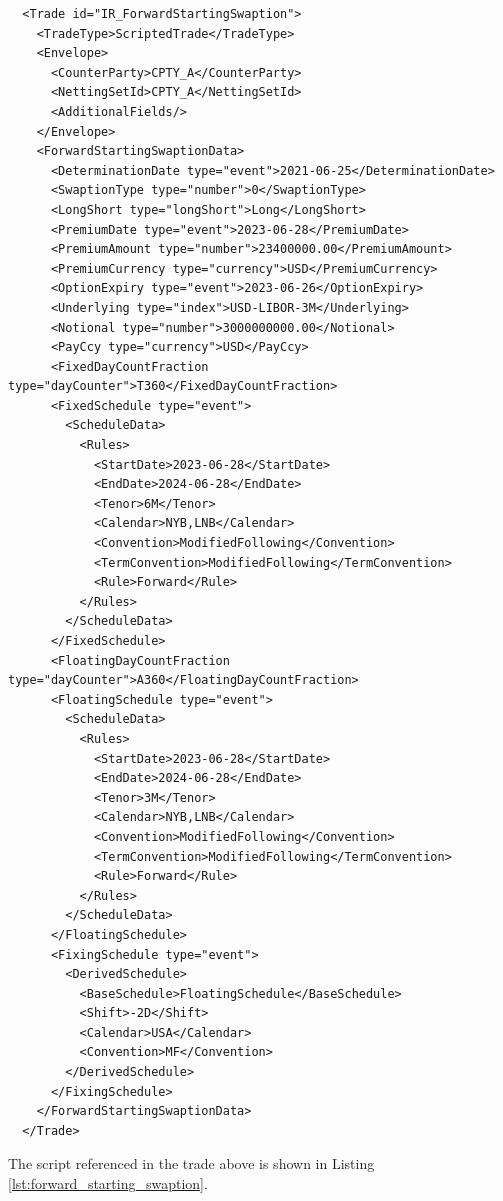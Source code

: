 \begin{verbatim}
  <Trade id="IR_ForwardStartingSwaption">
    <TradeType>ScriptedTrade</TradeType>
    <Envelope>
      <CounterParty>CPTY_A</CounterParty>
      <NettingSetId>CPTY_A</NettingSetId>
      <AdditionalFields/>
    </Envelope>
    <ForwardStartingSwaptionData>
      <DeterminationDate type="event">2021-06-25</DeterminationDate>
      <SwaptionType type="number">0</SwaptionType>
      <LongShort type="longShort">Long</LongShort>
      <PremiumDate type="event">2023-06-28</PremiumDate>
      <PremiumAmount type="number">23400000.00</PremiumAmount>
      <PremiumCurrency type="currency">USD</PremiumCurrency>
      <OptionExpiry type="event">2023-06-26</OptionExpiry>
      <Underlying type="index">USD-LIBOR-3M</Underlying>
      <Notional type="number">3000000000.00</Notional>
      <PayCcy type="currency">USD</PayCcy>
      <FixedDayCountFraction type="dayCounter">T360</FixedDayCountFraction>
      <FixedSchedule type="event">
        <ScheduleData>
          <Rules>
            <StartDate>2023-06-28</StartDate>
            <EndDate>2024-06-28</EndDate>
            <Tenor>6M</Tenor>
            <Calendar>NYB,LNB</Calendar>
            <Convention>ModifiedFollowing</Convention>
            <TermConvention>ModifiedFollowing</TermConvention>
            <Rule>Forward</Rule>
          </Rules>
        </ScheduleData>
      </FixedSchedule>
      <FloatingDayCountFraction type="dayCounter">A360</FloatingDayCountFraction>
      <FloatingSchedule type="event">
        <ScheduleData>
          <Rules>
            <StartDate>2023-06-28</StartDate>
            <EndDate>2024-06-28</EndDate>
            <Tenor>3M</Tenor>
            <Calendar>NYB,LNB</Calendar>
            <Convention>ModifiedFollowing</Convention>
            <TermConvention>ModifiedFollowing</TermConvention>
            <Rule>Forward</Rule>
          </Rules>
        </ScheduleData>
      </FloatingSchedule>
      <FixingSchedule type="event">
        <DerivedSchedule>
          <BaseSchedule>FloatingSchedule</BaseSchedule>
          <Shift>-2D</Shift>
          <Calendar>USA</Calendar>
          <Convention>MF</Convention>
        </DerivedSchedule>
      </FixingSchedule>
    </ForwardStartingSwaptionData>
  </Trade>
\end{verbatim}

The script referenced in the trade above is shown in Listing \ref{lst:forward_starting_swaption}.


